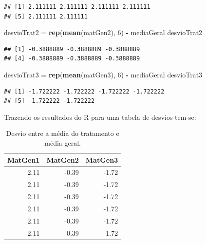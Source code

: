 \documentclass[
]{article}
\newenvironment{Shaded}{\begin{snugshade}}{\end{snugshade}}
\newcommand{\DecValTok}[1]{\textcolor[rgb]{0.00,0.00,0.81}{#1}}
\newcommand{\KeywordTok}[1]{\textcolor[rgb]{0.13,0.29,0.53}{\textbf{#1}}}
\newcommand{\NormalTok}[1]{#1}
\newcommand{\OperatorTok}[1]{\textcolor[rgb]{0.81,0.36,0.00}{\textbf{#1}}}
\newcommand{\StringTok}[1]{\textcolor[rgb]{0.31,0.60,0.02}{#1}}
\begin{document}
\begin{verbatim}
## [1] 2.111111 2.111111 2.111111 2.111111
## [5] 2.111111 2.111111
\end{verbatim}

\begin{Shaded}
\begin{Highlighting}[]
\NormalTok{desvioTrat2 =}\StringTok{ }\KeywordTok{rep}\NormalTok{(}\KeywordTok{mean}\NormalTok{(matGen2), }\DecValTok{6}\NormalTok{) }\OperatorTok{-}\StringTok{ }\NormalTok{mediaGeral}
\NormalTok{desvioTrat2}
\end{Highlighting}
\end{Shaded}

\begin{verbatim}
## [1] -0.3888889 -0.3888889 -0.3888889
## [4] -0.3888889 -0.3888889 -0.3888889
\end{verbatim}

\begin{Shaded}
\begin{Highlighting}[]
\NormalTok{desvioTrat3 =}\StringTok{ }\KeywordTok{rep}\NormalTok{(}\KeywordTok{mean}\NormalTok{(matGen3), }\DecValTok{6}\NormalTok{) }\OperatorTok{-}\StringTok{ }\NormalTok{mediaGeral}
\NormalTok{desvioTrat3}
\end{Highlighting}
\end{Shaded}

\begin{verbatim}
## [1] -1.722222 -1.722222 -1.722222 -1.722222
## [5] -1.722222 -1.722222
\end{verbatim}

Trazendo os resultados do R para uma tabela de desvios tem-se:

\begin{table}

\caption{\label{tab:unnamed-chunk-19}Desvio entre a média do tratamento e média geral.}
\centering
\begin{tabular}[t]{r|r|r}
\hline
MatGen1 & MatGen2 & MatGen3\\
\hline
2.11 & -0.39 & -1.72\\
\hline
2.11 & -0.39 & -1.72\\
\hline
2.11 & -0.39 & -1.72\\
\hline
2.11 & -0.39 & -1.72\\
\hline
2.11 & -0.39 & -1.72\\
\hline
2.11 & -0.39 & -1.72\\
\hline
\end{tabular}
\end{table}
\end{document}
